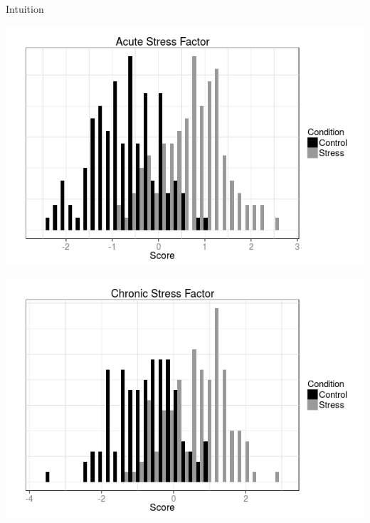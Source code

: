 \begin{frame}{Intuition}
	\begin{minipage}{0.47\textwidth}
    		\begin{center}
        		\includegraphics[scale=.25, center]{figures/stress_comp1.png}
    		\end{center}
	\end{minipage}
	\begin{minipage}{0.5\textwidth}
    		\begin{center}
        		\includegraphics[scale=.25, center]{figures/stress_comp2.png}
    		\end{center}
	\end{minipage}
\end{frame}